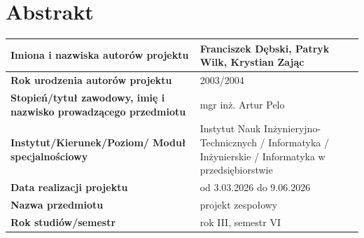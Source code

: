 
\renewcommand{\rmdefault}{ptm} %
\renewcommand{\sfdefault}{phv} %
\chapter*{\fontsize{12}{14}\selectfont Abstrakt}

\vspace{0.5cm}
\noindent
\begin{tabular}{|p{5cm}|p{10cm}|}
\hline
\textbf{Imiona i nazwiska autorów projektu} & Franciszek Dębski, Patryk Wilk, Krystian Zając\\
\hline
\textbf{Rok urodzenia autorów projektu} & 2003/2004\\
\hline
\textbf{Stopień/tytuł zawodowy, imię i nazwisko prowadzącego przedmiotu} & mgr inż. Artur Pelo\\
\hline
\textbf{Instytut/Kierunek/Poziom/ Moduł specjalnościowy} & Instytut Nauk Inżynieryjno-Technicznych / Informatyka / Inżynierskie / Informatyka w przedsiębiorstwie\\
\hline
\textbf{Data realizacji projektu} & od 3.03.2026 do 9.06.2026\\
\hline
\textbf{Nazwa przedmiotu} & projekt zespołowy\\
\hline
\textbf{Rok studiów/semestr} & rok III, semestr VI\\
\hline
\end{tabular}

\vspace{1.5cm}

